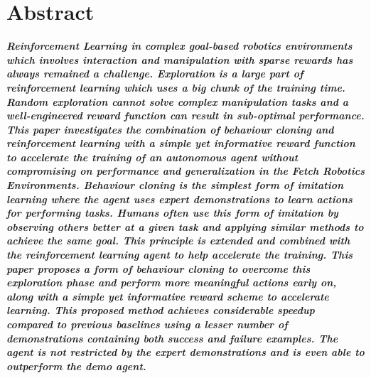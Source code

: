 \thispagestyle{acknowledgements}
\section*{Abstract}

\textbf{\textit{Reinforcement Learning in complex goal-based robotics environments which involves interaction and manipulation with sparse rewards has always remained a challenge. Exploration is a large part of reinforcement learning which uses a big chunk of the training time. Random exploration cannot solve complex manipulation tasks and a well-engineered reward function can result in sub-optimal performance. This paper investigates the combination of behaviour cloning and reinforcement learning with a simple yet informative reward function to accelerate the training of an autonomous agent without compromising on performance and generalization in the Fetch Robotics Environments. Behaviour cloning is the simplest form of imitation learning where the agent uses expert demonstrations to learn actions for performing tasks. Humans often use this form of imitation by observing others better at a given task and applying similar methods to achieve the same goal. This principle is extended and combined with the reinforcement learning agent to help accelerate the training. This paper proposes a form of behaviour cloning to overcome this exploration phase and perform more meaningful actions early on, along with a simple yet informative reward scheme to accelerate learning. This proposed method achieves considerable speedup compared to previous baselines using a lesser number of demonstrations containing both success and failure examples. The agent is not restricted by the expert demonstrations and is even able to outperform the demo agent.}}